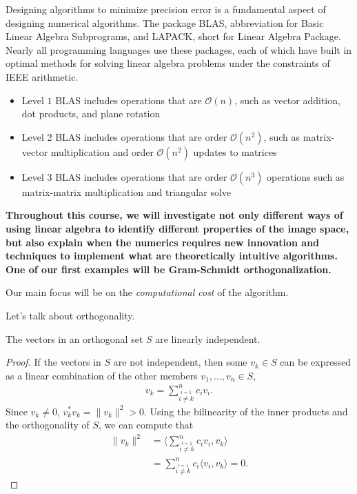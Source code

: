 \documentclass{ximera}
\begin{document}
Designing algorithms to minimize precision error is a fundamental aspect of designing numerical algorithms.  The package BLAS, abbreviation for Basic Linear Algebra Subprograms, and LAPACK, short for Linear Algebra Package.  Nearly all programming languages use these packages, each of which have built in optimal methods for solving linear algebra problems under the constraints of IEEE arithmetic.  
\begin{itemize}
    \item Level $1$ BLAS includes operations that are $\mathcal{O}(n)$, such as vector addition, dot products, and plane rotation
    \item Level 2 BLAS includes operations that are order $\mathcal{O}(n^2)$, such as matrix-vector multiplication and order $\mathcal{O}(n^2)$ updates to matrices
    \item Level 3 BLAS includes operations that are order $\mathcal{O}(n^3)$ operations such as matrix-matrix multiplication and triangular solve
\end{itemize}

\textbf{Throughout this course, we will investigate not only different ways of using linear algebra to identify different properties of the image space, but also explain when the numerics requires new innovation and techniques to implement what are theoretically intuitive algorithms. One of our first examples will be Gram-Schmidt orthogonalization.}

Our main focus will be on the \textit{computational cost} of the algorithm.

Let's talk about orthogonality.

\begin{theorem}
    The vectors in an orthogonal set $S$ are linearly independent.
\end{theorem}
\begin{proof}
    If the vectors in $S$ are not independent, then some $v_k\in S$ can be expressed as a linear combination of the other members $v_1, ..., v_n \in S$, 
    \begin{align}
        v_k = \sum\limits_{\stackrel{i=1}{i\neq k}}^n c_iv_i.
    \end{align}
    Since $v_k \neq 0$, $v_k^*v_k= \|v_k\|^2>0$.  Using the bilinearity of the inner products and the orthogonality of $S$, we can compute that
    \begin{align}
        \|v_k\|^2 &= \langle \sum\limits_{\stackrel{i=1}{i\neq k}}^n c_iv_i, v_k\rangle 
        \\
        &=  \sum\limits_{\stackrel{i=1}{i\neq k}}^n c_i\langle v_i, v_k\rangle  = 0.
    \end{align}
\end{proof}
\end{document}
